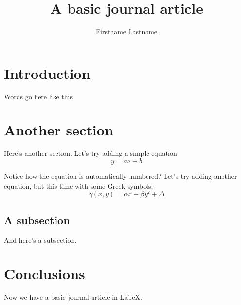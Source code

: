 \documentclass[]{article}
\title{A basic journal article}
\author{Firstname Lastname}
\begin{document}
\maketitle


\section{Introduction}
Words go here like this


\section{Another section}
Here's another section. Let's try adding a simple equation
\begin{equation}
    y = ax + b
\end{equation}

Notice how the equation is automatically numbered? Let's try adding another
equation, but this time with some Greek symbols:
\begin{equation}
    \gamma ( x, y ) = \alpha x + \beta y^2 + \Delta
\end{equation}


\subsection{A subsection}
And here's a subsection.


\section{Conclusions}
Now we have a basic journal article in LaTeX.
\end{document}
